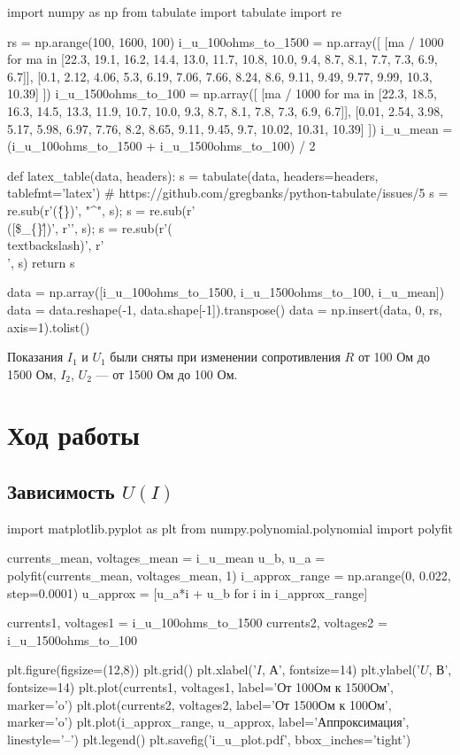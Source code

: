 \documentclass[12pt, a4paper]{article}
\begin{document}
\begin{pycode}
import numpy as np
from tabulate import tabulate
import re

rs = np.arange(100, 1600, 100)
i_u_100ohms_to_1500 = np.array([
  [ma / 1000 for ma in [22.3, 19.1, 16.2, 14.4, 13.0, 11.7, 10.8, 10.0, 9.4, 8.7, 8.1, 7.7, 7.3, 6.9, 6.7]],
  [0.1, 2.12, 4.06, 5.3, 6.19, 7.06, 7.66, 8.24, 8.6, 9.11, 9.49, 9.77, 9.99, 10.3, 10.39]
])
i_u_1500ohms_to_100 = np.array([
  [ma / 1000 for ma in [22.3, 18.5, 16.3, 14.5, 13.3, 11.9, 10.7, 10.0, 9.3, 8.7, 8.1, 7.8, 7.3, 6.9, 6.7]],
  [0.01, 2.54, 3.98, 5.17, 5.98, 6.97, 7.76, 8.2, 8.65, 9.11, 9.45, 9.7, 10.02, 10.31, 10.39]
])
i_u_mean = (i_u_100ohms_to_1500 + i_u_1500ohms_to_100) / 2

def latex_table(data, headers):
  s = tabulate(data, headers=headers, tablefmt='latex')
  # https://github.com/gregbanks/python-tabulate/issues/5
  s = re.sub(r'(\^\{\})', "^", s); s = re.sub(r'\\([\$\_\{\}\^])', r'\1', s); s = re.sub(r'(\\textbackslash{})', r'\\', s)
  return s

data = np.array([i_u_100ohms_to_1500, i_u_1500ohms_to_100, i_u_mean])
data = data.reshape(-1, data.shape[-1]).transpose()
data = np.insert(data, 0, rs, axis=1).tolist()
\end{pycode}

\begin{table}[H]
\end{table} 

Показания $I_1$ и $U_1$ были сняты при изменении сопротивления $R$ от 100 Ом
до 1500 Ом, $I_2$, $U_2$ — от 1500 Ом до 100 Ом.

\section*{Ход работы}

\subsection*{Зависимость $U(I)$}

\begin{pycode}
import matplotlib.pyplot as plt
from numpy.polynomial.polynomial import polyfit

currents_mean, voltages_mean = i_u_mean
u_b, u_a = polyfit(currents_mean, voltages_mean, 1)
i_approx_range = np.arange(0, 0.022, step=0.0001)
u_approx = [u_a*i + u_b for i in i_approx_range]

currents1, voltages1 = i_u_100ohms_to_1500
currents2, voltages2 = i_u_1500ohms_to_100

plt.figure(figsize=(12,8))
plt.grid()
plt.xlabel('$I$, А', fontsize=14)
plt.ylabel('$U$, В', fontsize=14)
plt.plot(currents1, voltages1, label='От 100Ом к 1500Ом', marker='o')
plt.plot(currents2, voltages2, label='От 1500Ом к 100Ом', marker='o')
plt.plot(i_approx_range, u_approx, label='Аппроксимация', linestyle='--')
plt.legend()
plt.savefig('i_u_plot.pdf', bbox_inches='tight')
\end{pycode}
\end{document}
